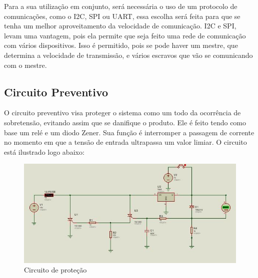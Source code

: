 Para a sua utilização em conjunto, será necessária o uso de um protocolo de
comunicações, como o I2C, SPI ou UART, essa escolha será feita para que se tenha um
melhor aproveitamento da velocidade de comunicação. I2C e SPI, levam uma
vantagem, pois ela permite que seja feito uma rede de comunicação com vários
dispositivos. Isso é permitido, pois se pode haver um mestre, que determina a
velocidade de transmissão, e vários escravos que vão se comunicando com o mestre.
\subsection{Circuito Preventivo}
O circuito preventivo visa proteger o sistema como um todo da ocorrência de sobretensão, evitando assim que se danifique o produto. Ele é feito tendo como base um relé e um diodo Zener. Sua função é interromper a passagem de corrente no momento em que a tensão de entrada ultrapassa um valor limiar. O circuito está ilustrado logo abaixo:
 \begin{figure}[H]
 	\begin{center}
 		\includegraphics[scale = 0.75]{figuras/Protecao.JPG}
 		\caption{Circuito de proteção}
 	\end{center}
 \end{figure}

